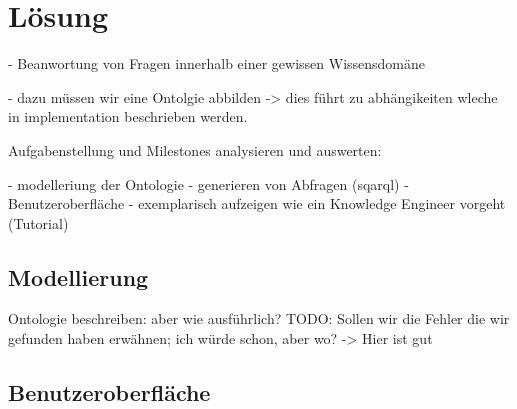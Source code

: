 \chapter{Lösung}
\label{chap:loesung}


 - Beanwortung von Fragen innerhalb einer gewissen Wissensdomäne

 - dazu müssen wir eine Ontolgie abbilden -> dies führt zu abhängikeiten wleche in implementation beschrieben werden.


Aufgabenstellung und Milestones analysieren und auswerten:

 - modelleriung der Ontologie
 - generieren von Abfragen (sqarql)
 - Benutzeroberfläche
 - exemplarisch aufzeigen wie ein Knowledge Engineer vorgeht (Tutorial)
\section{Modellierung}
\label{sec:modellierung}
Ontologie beschreiben: aber wie ausführlich? 
TODO: Sollen wir die Fehler die wir gefunden haben erwähnen; ich würde schon, aber wo? -> Hier ist gut


\section{Benutzeroberfläche}
\label{sec:gui}


